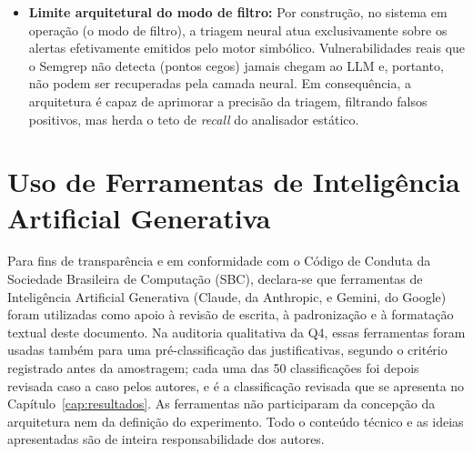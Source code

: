 \begin{itemize}

\item \textbf{Limite arquitetural do modo de filtro:} Por construção, no sistema em operação (o modo de filtro), a triagem neural atua exclusivamente sobre os alertas efetivamente emitidos pelo motor simbólico. Vulnerabilidades reais que o Semgrep não detecta (pontos cegos) jamais chegam ao LLM e, portanto, não podem ser recuperadas pela camada neural. Em consequência, a arquitetura é capaz de aprimorar a precisão da triagem, filtrando falsos positivos, mas herda o teto de \textit{recall} do analisador estático.
\end{itemize}

\section{Uso de Ferramentas de Inteligência Artificial Generativa}
Para fins de transparência e em conformidade com o Código de Conduta da Sociedade Brasileira de Computação (SBC), declara-se que ferramentas de Inteligência Artificial Generativa (Claude, da Anthropic, e Gemini, do Google) foram utilizadas como apoio à revisão de escrita, à padronização e à formatação textual deste documento. Na auditoria qualitativa da Q4, essas ferramentas foram usadas também para uma pré-classificação das justificativas, segundo o critério registrado antes da amostragem; cada uma das 50 classificações foi depois revisada caso a caso pelos autores, e é a classificação revisada que se apresenta no Capítulo~\ref{cap:resultados}. As ferramentas não participaram da concepção da arquitetura nem da definição do experimento. Todo o conteúdo técnico e as ideias apresentadas são de inteira responsabilidade dos autores.
